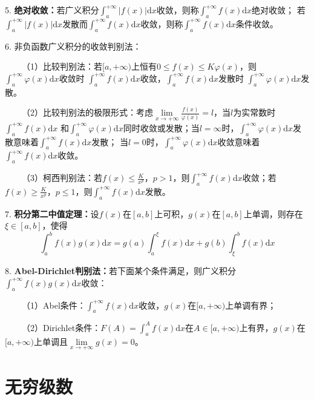 5. \textbf{绝对收敛：}若广义积分$\int_a^{+\infty}\left|f(x)\right|\mathrm{d}x$收敛，则称$\int_a^{+\infty}f(x)\mathrm{d}x$绝对收敛；
若$\int_a^{+\infty}\left|f(x)\right|\mathrm{d}x$发散而$\int_a^{+\infty}f(x)\mathrm{d}x$收敛，则称$\int_a^{+\infty}f(x)\mathrm{d}x$条件收敛。

6. 非负函数广义积分的收敛判别法：

~~~~（1）比较判别法：若$[a,+\infty)$上恒有$0\leqslant f(x)\leqslant K\varphi(x)$，则$\int_a^{+\infty}\varphi(x)\mathrm{d}x$收敛时 $\int_a^{+\infty}f(x)\mathrm{d}x$收敛，$\int_a^{+\infty}f(x)\mathrm{d}x$发散时
$\int_a^{+\infty}\varphi(x)\mathrm{d}x$发散。

~~~~（2）比较判别法的极限形式：考虑$\lim\limits_{x\rightarrow+\infty}\frac{f(x)}{\varphi(x)}=l$，当$l$为实常数时$\int_a^{+\infty}f(x)\mathrm{d}x$
和$\int_a^{+\infty}\varphi(x)\mathrm{d}x$同时收敛或发散；当$l=\infty$时，$\int_a^{+\infty}\varphi(x)\mathrm{d}x$发散意味着$\int_a^{+\infty}f(x)\mathrm{d}x$发散；
当$l=0$时，$\int_a^{+\infty}\varphi(x)\mathrm{d}x$收敛意味着$\int_a^{+\infty}f(x)\mathrm{d}x$收敛。

~~~~（3）柯西判别法：若$f(x)\leqslant\frac{K}{x^p}$，$p>1$，则$\int_a^{+\infty}f(x)\mathrm{d}x$收敛；若$f(x)\geqslant \frac{K}{x^p}$，$p\leqslant 1$，则$\int_a^{+\infty}f(x)\mathrm{d}x$发散。

7. \textbf{积分第二中值定理：}设$f(x)$在$[a,b]$上可积，$g(x)$在$[a,b]$上单调，则存在$\xi \in [a,b]$，使得
\begin{equation*}
    \int_a^b f(x)g(x)\mathrm{d}x=g(a)\int_a^\xi f(x)\mathrm{d}x+g(b)\int_\xi ^b f(x)\mathrm{d}x
\end{equation*}

8. \textbf{Abel-Dirichlet判别法：}若下面某个条件满足，则广义积分$\int_a^{+\infty} f(x)g(x)\mathrm{d}x$收敛：

~~~~（1）Abel条件：$\int_a^{+\infty}f(x)\mathrm{d}x$收敛，$g(x)$在$[a,+\infty)$上单调有界；

~~~~（2）Dirichlet条件：$F(A)=\int_a^Af(x)\mathrm{d}x$在$A\in[a,+\infty)$上有界，$g(x)$在$[a,+\infty)$上单调且$\lim\limits_{x\rightarrow +\infty}g(x)=0$。

\section{无穷级数}

